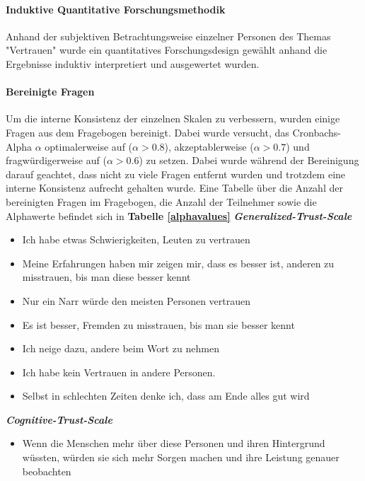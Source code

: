 \documentclass[a4paper,11pt]{article}%
\renewcommand{\\}{\vspace*{0.5\baselineskip} \newline}
\begin{document}
				\paragraph{Induktive Quantitative Forschungsmethodik}
				Anhand der subjektiven Betrachtungsweise einzelner Personen des Themas "Vertrauen" wurde ein quantitatives Forschungsdesign gewählt anhand die Ergebnisse induktiv interpretiert und ausgewertet wurden.


\paragraph{Bereinigte Fragen}
Um die interne Konsistenz der einzelnen Skalen zu verbessern, wurden einige Fragen aus dem Fragebogen bereinigt. Dabei wurde versucht, das Cronbachs-Alpha $\alpha$ optimalerweise auf ($\alpha > 0.8$), akzeptablerweise ($\alpha > 0.7$) und fragwürdigerweise auf ($\alpha > 0.6$) zu setzen. Dabei wurde während der Bereinigung darauf geachtet, dass nicht zu viele Fragen entfernt wurden und trotzdem eine interne Konsistenz aufrecht gehalten wurde. Eine Tabelle über die Anzahl der bereinigten Fragen im Fragebogen, die Anzahl der Teilnehmer sowie die Alphawerte befindet sich in \textbf{Tabelle \ref{alphavalues}} \\
\textbf{\textit{Generalized-Trust-Scale}}
\begin{itemize}
	\item Ich habe etwas Schwierigkeiten, Leuten zu vertrauen
	\item Meine Erfahrungen haben mir zeigen mir, dass es besser ist, anderen zu misstrauen, bis man diese besser kennt
	\item Nur ein Narr würde den meisten Personen vertrauen
	\item Es ist besser, Fremden zu misstrauen, bis man sie besser kennt
	\item Ich neige dazu, andere beim Wort zu nehmen
	\item Ich habe kein Vertrauen in andere Personen.
	\item Selbst in schlechten Zeiten denke ich, dass am Ende alles gut wird
\end{itemize}

\textbf{\textit{Cognitive-Trust-Scale}}
\begin{itemize}
	\item Wenn die Menschen mehr über diese Personen und ihren Hintergrund wüssten, würden sie sich mehr Sorgen machen und ihre Leistung genauer beobachten
\end{itemize}
\end{document}
